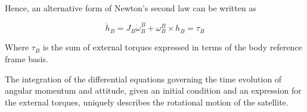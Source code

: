 \indent
	Hence, an alternative form of Newton's second law can be written as

\begin{equation}
	\dot{h}_{B} = J_{B}\dot{\omega}^{B}_{B} + \omega^{B}_{B} \times h_{B} = \tau_{B}
\end{equation}

\indent 
	Where $\tau_{B}$ is the sum of external torques expressed in terms of the body reference frame basis.

\indent
	The integration of the differential equations governing the time evolution of angular momentum and attitude, given an initial condition and an expression for the external torques, uniquely describes the rotational motion of the satellite.